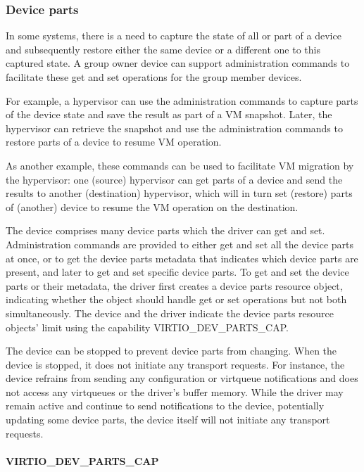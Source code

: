 \subsubsection{Device parts}\label{sec:Basic Facilities of a Virtio Device / Device groups / Group administration commands / Device parts}

In some systems, there is a need to capture the state of all or part of
a device and subsequently restore either the same device or a
different one to this captured state. A group owner device can support
administration commands to facilitate these get and set operations for
the group member devices.

For example, a hypervisor can use the administration commands to
capture parts of the device state and save the result as part of
a VM snapshot. Later, the hypervisor can retrieve the snapshot and use the
administration commands to restore parts of a device to resume
VM operation.

As another example, these commands can be used to facilitate VM migration by the
hypervisor: one (source) hypervisor can get parts of a device and send
the results to another (destination) hypervisor, which will in turn
set (restore) parts of (another) device to resume the VM operation on
the destination.

The device comprises many device parts which the driver can get and set.
Administration commands are provided to either get and set all the device
parts at once, or to get the device parts metadata that indicates which
device parts are present, and later to get and set specific device parts.
To get and set the device parts or their metadata, the driver first creates a
device parts resource object, indicating whether the object should
handle get or set operations but not both simultaneously. The device and the
driver indicate the device parts resource objects' limit using the capability
VIRTIO_DEV_PARTS_CAP.

The device can be stopped to prevent device parts from changing.
When the device is stopped, it does not initiate any transport requests.
For instance, the device refrains from sending any configuration or
virtqueue notifications and does not access any virtqueues or the driver's
buffer memory. While the driver may remain active and continue to send
notifications to the device, potentially updating some device parts,
the device itself will not initiate any transport requests.

\paragraph{VIRTIO_DEV_PARTS_CAP}
\label{par:Basic Facilities of a Virtio Device / Device groups / Group administration commands / Device parts / VIRTIO_DEV_PARTS_CAP}

